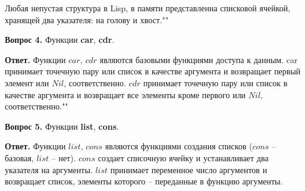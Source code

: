 \documentclass[12pt]{report}
\begin{document}
Любая непустая структура в Lisp, в памяти представленна списковой ячейкой, хранящей два указателя: на голову и хвост.""\newline

\textbf{Вопрос 4.} Функции \textbf{car}, \textbf{cdr}.
	
\textbf{Ответ.} Функции $car$, $cdr$ являются базовыми функциями доступа к
данным. car принимает точечную пару или список в качестве аргумента
и возвращает первый элемент или $Nil$, соответственно. $cdr$ принимает точечную пару или список в качестве аргумента и возвращает все элементы
кроме первого или $Nil$, соответственно.""\newline
	
\textbf{Вопрос 5.} Функции \textbf{list}, \textbf{cons}.
	
\textbf{Ответ.} Функции $list$, $cons$ являются функциями создания списков
($cons$ – базовая, $list$ – нет). $cons$ создает списочную ячейку и устанавливает два указателя на аргументы. $list$ принимает переменное число аргументов и возвращает список, элементы которого – переданные в функцию
аргументы.
	
	
	
	
\end{document}
